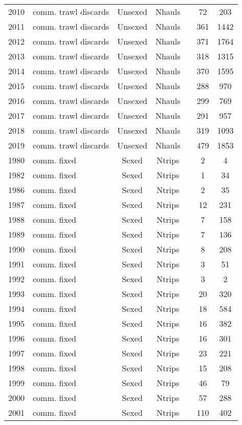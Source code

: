 \begin{longtable}[t]{c>{\centering\arraybackslash}p{3cm}ccccc}
2010 & comm. trawl discards & Unsexed & Nhauls &  & 72 & 203\\
2011 & comm. trawl discards & Unsexed & Nhauls &  & 361 & 1442\\
2012 & comm. trawl discards & Unsexed & Nhauls &  & 371 & 1764\\
2013 & comm. trawl discards & Unsexed & Nhauls &  & 318 & 1315\\
2014 & comm. trawl discards & Unsexed & Nhauls &  & 370 & 1595\\
2015 & comm. trawl discards & Unsexed & Nhauls &  & 288 & 970\\
2016 & comm. trawl discards & Unsexed & Nhauls &  & 299 & 769\\
2017 & comm. trawl discards & Unsexed & Nhauls &  & 291 & 957\\
2018 & comm. trawl discards & Unsexed & Nhauls &  & 319 & 1093\\
2019 & comm. trawl discards & Unsexed & Nhauls &  & 479 & 1853\\
1980 & comm. fixed & Sexed & Ntrips &  & 2 & 4\\
1982 & comm. fixed & Sexed & Ntrips &  & 1 & 34\\
1986 & comm. fixed & Sexed & Ntrips &  & 2 & 35\\
1987 & comm. fixed & Sexed & Ntrips &  & 12 & 231\\
1988 & comm. fixed & Sexed & Ntrips &  & 7 & 158\\
1989 & comm. fixed & Sexed & Ntrips &  & 7 & 136\\
1990 & comm. fixed & Sexed & Ntrips &  & 8 & 208\\
1991 & comm. fixed & Sexed & Ntrips &  & 3 & 51\\
1992 & comm. fixed & Sexed & Ntrips &  & 3 & 2\\
1993 & comm. fixed & Sexed & Ntrips &  & 20 & 320\\
1994 & comm. fixed & Sexed & Ntrips &  & 18 & 584\\
1995 & comm. fixed & Sexed & Ntrips &  & 16 & 382\\
1996 & comm. fixed & Sexed & Ntrips &  & 16 & 301\\
1997 & comm. fixed & Sexed & Ntrips &  & 23 & 221\\
1998 & comm. fixed & Sexed & Ntrips &  & 15 & 208\\
1999 & comm. fixed & Sexed & Ntrips &  & 46 & 79\\
2000 & comm. fixed & Sexed & Ntrips &  & 57 & 288\\
2001 & comm. fixed & Sexed & Ntrips &  & 110 & 402\\

\end{longtable}
